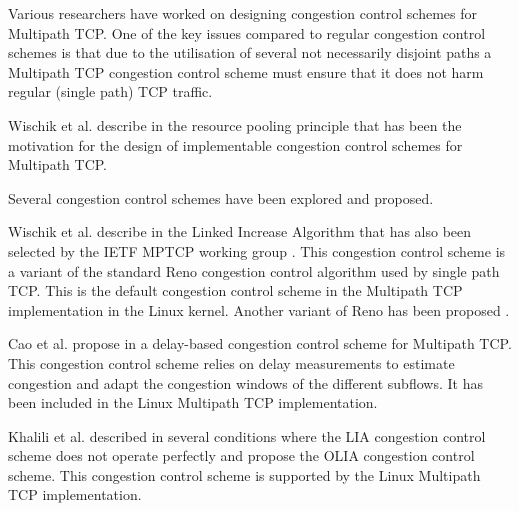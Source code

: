 Various researchers have worked on designing congestion control schemes for Multipath TCP. One of the key issues compared to regular congestion control schemes is that due to the utilisation of several not necessarily disjoint paths a Multipath TCP congestion control scheme must ensure that it does not harm regular (single path) TCP traffic.

Wischik et al. describe in \cite{Wischik_Resource:2008} the resource pooling principle that has been the motivation for the design of implementable congestion control schemes for Multipath TCP. 

Several congestion control schemes have been explored and proposed.

Wischik et al. describe in \cite{Wischik_Design:2011} the Linked Increase Algorithm that has also been selected by the IETF MPTCP working group \cite{rfc6356}. This congestion control scheme is a variant of the standard Reno congestion control algorithm used by single path TCP. This is the default congestion control scheme in the Multipath TCP implementation in the Linux kernel. Another variant of Reno has been proposed \cite{Vo_mReno:2014}.  %


Cao et al. propose in
\cite{Cao_Delay:2012} %
a delay-based congestion control scheme for Multipath TCP. This congestion control scheme relies on delay measurements to estimate congestion and adapt the congestion windows of the different subflows. It has been included in the Linux Multipath TCP implementation.

Khalili et al. described in \cite{Khalili_MPTCP:2012,Khalili_MPTCP:2013} several conditions where the LIA congestion control scheme does not operate perfectly and propose the OLIA congestion control scheme. This congestion control scheme is supported by the Linux Multipath TCP implementation.  %


